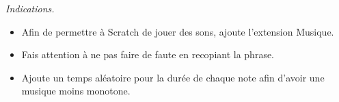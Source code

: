 \documentclass[class=report,crop=false, 12pt]{standalone}
\begin{document}
\begin{enigme}
\bigskip

\emph{Indications.}
\begin{itemize}
  \item Afin de permettre à Scratch de jouer des sons, ajoute l'extension \og{}Musique\fg{}.
  \item Fais attention à ne pas faire de faute en recopiant la phrase. %
  \item Ajoute un temps aléatoire pour la durée de chaque note afin d'avoir une musique moins monotone.
\end{itemize}


\end{enigme}
\end{document}
